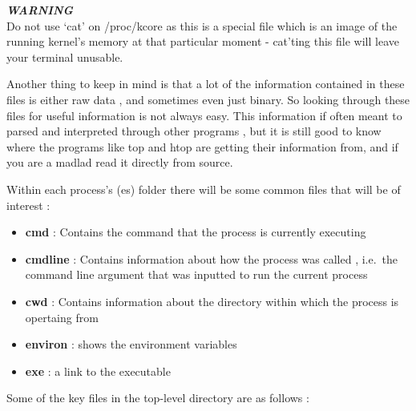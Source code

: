 
\tcolorboxnote
{

\textbf{\textit{WARNING}} \\

Do not use `cat' on /proc/kcore as this is a special file which is an
image of the running kernel's memory at that particular moment - cat'ting this
file will leave your terminal unusable.\\

}




Another thing to keep in mind is that a lot of the information contained in
these files is either raw data , and sometimes even just binary. So looking
through these files for useful information is not always easy. This information
if often meant to parsed and interpreted through other programs , but it is
still good to know where the programs like top and htop are getting their
information from, and if you are a madlad read it directly from source.

Within each process's (es) folder there will be some common files that will be
of interest :


\begin{itemize}[noitemsep]

	\item \textbf{cmd} : Contains the command that the process is currently
		executing

	\item \textbf{cmdline} : Contains information about how the process was
		called , i.e.\ the command line argument that was inputted to run the
		current process 

	\item \textbf{cwd} : Contains information about the directory within which
		the process is opertaing from

	\item \textbf{environ} : shows the environment variables

	\item \textbf{exe} : a link to the executable

\end{itemize}


Some of the key files in the top-level directory are as follows :

